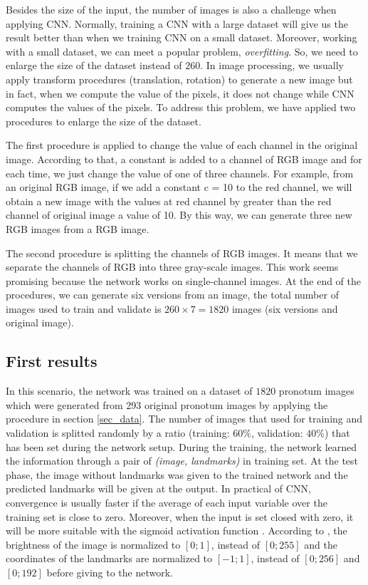 \documentclass[10pt]{article}
\begin{document}
Besides the size of the input, the number of images is also a challenge when applying CNN. Normally, training a CNN with a large dataset will give us the result better than when we training CNN on a small dataset. Moreover, working with a small dataset, we can meet a popular problem, \textit{overfitting}. So, we need to enlarge the size of the dataset instead of $260$. In image processing, we usually apply transform procedures (translation, rotation) to generate a new image but in fact, when we compute the value of the pixels, it does not change while CNN computes the values of the pixels. To address this problem, we have applied two procedures to enlarge the size of the dataset.

The first procedure is applied to change the value of each
channel in the original image. According to that, a constant is
added to a channel of RGB image and for each time, we just
change the value of one of three channels. For example, from
an original RGB image, if we add a constant c = 10 to the
red channel, we will obtain a new image with the values at
red channel by greater than the red channel of original image
a value of 10. By this way, we can generate three new RGB
images from a RGB image.

The second procedure is splitting the channels of RGB
images. It means that we separate the channels of RGB into
three gray-scale images. This work seems promising because
the network works on single-channel images. At the end of the procedures, we
can generate six versions from an image, the total number of
images used to train and validate is $260 \times 7 = 1820$ images
(six versions and original image).


\subsection{First results}
\label{sectrain1}
In this scenario, the network was trained on a dataset of $1820$ pronotum images which were generated from $293$ original pronotum images by applying the procedure in section \ref{sec_data}. The number of images that
used for training and validation is splitted randomly by a ratio
(training: $60\%$, validation: $40\%$) that has been set during the
network setup. During the training, the network learned the information through a pair of \textit{(image, landmarks)} in training set. At the test phase, the image without landmarks was given to the trained network and the predicted landmarks will be given at the output. In practical of CNN, convergence is
usually faster if the average of each input variable over the
training set is close to zero. Moreover, when the input is set
closed with zero, it will be more suitable with the sigmoid
activation function \cite{lecun2012efficient}. According to \cite{lecun2012efficient}, the brightness of
the image is normalized to $[0; 1]$, instead of $[0; 255]$ and the
coordinates of the landmarks are normalized to $[-1; 1]$, instead
of $[0; 256]$ and $[0; 192]$ before giving to the network.
\end{document}
